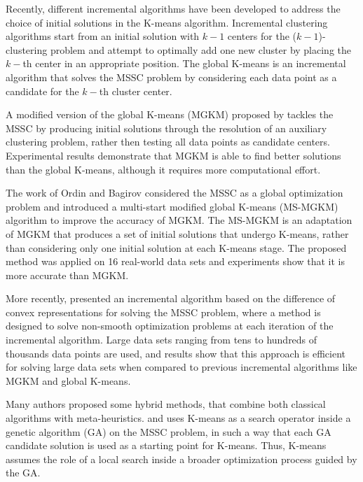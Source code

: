 Recently, different incremental algorithms have been developed to address the choice of initial solutions in the K-means algorithm. Incremental clustering algorithms start from an initial solution with $k - 1$ centers for the ($k - 1$)-clustering problem and attempt to optimally add one new cluster by placing the $k-$th center in an appropriate position. The global K-means \cite{Likas2003} is an incremental algorithm that solves the MSSC problem by considering each data point as a candidate for the $k-$th cluster center.

A modified version of the global K-means (MGKM) proposed by \cite{Bagirov2008} tackles the MSSC by producing initial solutions through the resolution of an auxiliary clustering problem, rather then testing all data points as candidate centers. Experimental results demonstrate that MGKM is able to find better solutions than the global K-means, although it requires more computational effort.
 
The work of Ordin and Bagirov \cite{Ordin2014} considered the MSSC as a global optimization problem and introduced a multi-start modified global K-means (MS-MGKM) algorithm to improve the accuracy of MGKM. The MS-MGKM is an adaptation of MGKM that produces a set of initial solutions that undergo K-means, rather than considering only one initial solution at each K-means stage. The proposed method was applied on 16 real-world data sets and experiments show that it is more accurate than MGKM.

More recently, \cite{Bagirov2016} presented an incremental algorithm based on the difference of convex representations for solving the MSSC problem, where a method is designed to solve non-smooth optimization problems at each iteration of the incremental algorithm. Large data sets ranging from tens to hundreds of thousands data points are used, and results show that this approach is efficient for solving large data sets when compared to previous incremental algorithms like MGKM and global K-means.

Many authors proposed some hybrid methods, that combine both classical algorithms with meta-heuristics. \cite{Krishna1999} and \cite{Lu2004} uses K-means as a search operator inside a genetic algorithm (GA) on the MSSC problem, in such a way that each GA candidate solution is used as a starting point for K-means. Thus, K-means assumes the role of a local search inside a broader optimization process guided by the GA.


